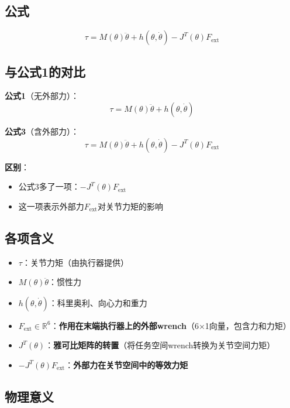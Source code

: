 \documentclass[12pt,a4paper]{article}
\begin{document}
\subsection{公式}

\begin{equation}
\tau = M(\theta)\ddot{\theta} + h(\theta, \dot{\theta}) - J^T(\theta)F_{\text{ext}} \tag{1}
\end{equation}

\subsection{与公式1的对比}

\textbf{公式1}（无外部力）：
\begin{equation}
\tau = M(\theta)\ddot{\theta} + h(\theta, \dot{\theta})
\end{equation}

\textbf{公式3}（含外部力）：
\begin{equation}
\tau = M(\theta)\ddot{\theta} + h(\theta, \dot{\theta}) - J^T(\theta)F_{\text{ext}}
\end{equation}

\textbf{区别}：
\begin{itemize}
\item 公式3多了一项：$-J^T(\theta)F_{\text{ext}}$
\item 这一项表示外部力$F_{\text{ext}}$对关节力矩的影响
\end{itemize}

\subsection{各项含义}

\begin{itemize}
\item $\tau$：关节力矩（由执行器提供）
\item $M(\theta)\ddot{\theta}$：惯性力
\item $h(\theta, \dot{\theta})$：科里奥利、向心力和重力
\item $F_{\text{ext}} \in \mathbb{R}^6$：\textbf{作用在末端执行器上的外部wrench}（6×1向量，包含力和力矩）
\item $J^T(\theta)$：\textbf{雅可比矩阵的转置}（将任务空间wrench转换为关节空间力矩）
\item $-J^T(\theta)F_{\text{ext}}$：\textbf{外部力在关节空间中的等效力矩}
\end{itemize}

\subsection{物理意义}
\end{document}
